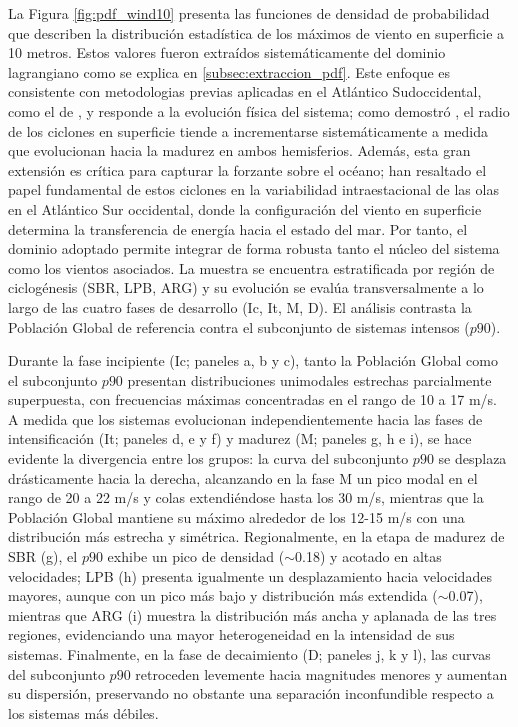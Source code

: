 La Figura \ref{fig:pdf_wind10} presenta las funciones de densidad de probabilidad que describen la distribución estadística de los máximos de viento en superficie a 10 metros. 
Estos valores fueron extraídos sistemáticamente del dominio lagrangiano como se explica en \ref{subsec:extraccion_pdf}. 
Este enfoque es consistente con metodologias previas aplicadas en el Atlántico Sudoccidental, como el de \citet{cardoso2022synoptic}, y responde a la evolución física del sistema; como demostró \citet{simmonds2000size}, el radio de los ciclones en superficie tiende a incrementarse sistemáticamente a medida que evolucionan hacia la madurez en ambos hemisferios. 
Además, esta gran extensión es crítica para capturar la forzante sobre el océano; \citet{sasaki2021intraseasonal} han resaltado el papel fundamental de estos ciclones en la variabilidad intraestacional de las olas en el Atlántico Sur occidental, donde la configuración del viento en superficie determina la transferencia de energía hacia el estado del mar. 
Por tanto, el dominio adoptado permite integrar de forma robusta tanto el núcleo del sistema como los vientos asociados.
La muestra se encuentra estratificada por región de ciclogénesis (SBR, LPB, ARG) y su evolución se evalúa transversalmente a lo largo de las cuatro fases de desarrollo (Ic, It, M, D). El análisis contrasta la Población Global de referencia contra el subconjunto de sistemas intensos ($p90$).

Durante la fase incipiente (Ic; paneles a, b y c), tanto la Población Global como el subconjunto $p90$ presentan distribuciones unimodales estrechas parcialmente superpuesta, con frecuencias máximas concentradas en el rango de 10 a 17 m/s. A medida que los sistemas evolucionan independientemente hacia las fases de intensificación (It; paneles d, e y f) y madurez (M; paneles g, h e i), se hace evidente la divergencia entre los grupos: la curva del subconjunto $p90$ se desplaza drásticamente hacia la derecha, alcanzando en la fase M un pico modal en el rango de 20 a 22 m/s y colas extendiéndose hasta los 30 m/s, mientras que la Población Global mantiene su máximo alrededor de los 12-15 m/s con una distribución más estrecha y simétrica. Regionalmente, en la etapa de madurez de SBR (g), el $p90$ exhibe un pico de densidad ($\sim$0.18) y acotado en altas velocidades; LPB (h) presenta igualmente un desplazamiento hacia velocidades mayores, aunque con un pico más bajo y distribución más extendida ($\sim$0.07), mientras que ARG (i) muestra la distribución más ancha y aplanada de las tres regiones, evidenciando una mayor heterogeneidad en la intensidad de sus sistemas. Finalmente, en la fase de decaimiento (D; paneles j, k y l), las curvas del subconjunto $p90$ retroceden levemente hacia magnitudes menores y aumentan su dispersión, preservando no obstante una separación inconfundible respecto a los sistemas más débiles.

